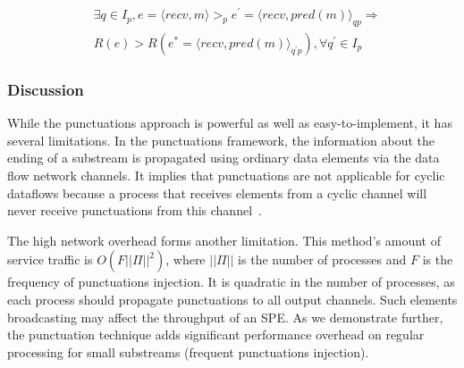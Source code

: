 \begin{align*}
& \exists q \in I_p, e = \langle recv,m \rangle >_p e^{'} = \langle recv,pred(m)\rangle_{qp} \Longrightarrow \\ 
& R(e) > R(e^{*}= \langle recv,pred(m) \rangle_{q^{'}p}), \forall q^{'} \in I_p
\end{align*}

\subsubsection{Discussion}

While the punctuations approach is powerful as well as easy-to-implement, it has several limitations. In the punctuations framework, the information about the ending of a substream is propagated using ordinary data elements via the data flow network channels. It implies that punctuations are not applicable for cyclic dataflows because a process that receives elements from a cyclic channel will never receive punctuations from this channel~\cite{carbone2018scalable}.

The high network overhead forms another limitation. This method's amount of service traffic is $O(F||\Pi||^2)$, where $||\Pi||$ is the number of processes and $F$ is the frequency of punctuations injection. It is quadratic in the number of processes, as each process should propagate punctuations to all output channels. Such elements broadcasting may affect the throughput of an SPE. As we demonstrate further, the punctuation technique adds significant performance overhead on regular processing for small substreams (frequent punctuations injection).